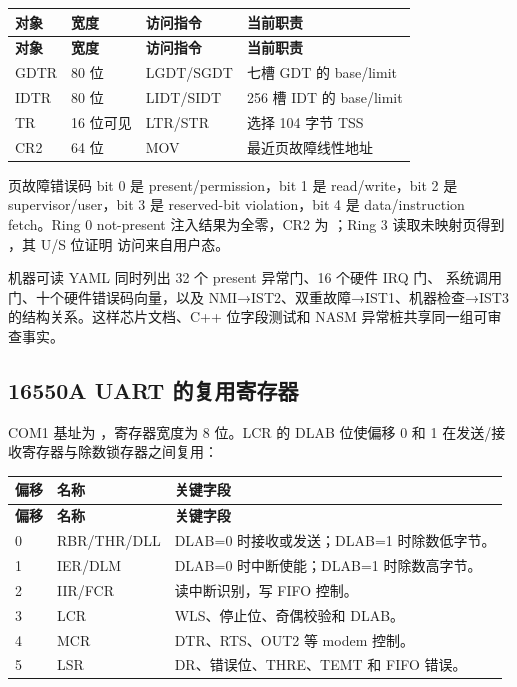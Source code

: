 \begin{longtable}{L{0.10\textwidth}L{0.18\textwidth}L{0.22\textwidth}L{0.34\textwidth}}
\toprule
\textbf{对象} & \textbf{宽度} & \textbf{访问指令} & \textbf{当前职责}\\
\midrule
\endfirsthead
\toprule
\textbf{对象} & \textbf{宽度} & \textbf{访问指令} & \textbf{当前职责}\\
\midrule
\endhead
GDTR & 80 位 & LGDT/SGDT & 七槽 GDT 的 base/limit\\
IDTR & 80 位 & LIDT/SIDT & 256 槽 IDT 的 base/limit\\
TR & 16 位可见 & LTR/STR & 选择 104 字节 TSS\\
CR2 & 64 位 & MOV & 最近页故障线性地址\\
\bottomrule
\end{longtable}

页故障错误码 bit 0 是 present/permission，bit 1 是 read/write，bit 2 是
supervisor/user，bit 3 是 reserved-bit violation，bit 4 是
data/instruction fetch。Ring 0 not-present 注入结果为全零，CR2 为
；Ring 3 读取未映射页得到 ，其 U/S 位证明
访问来自用户态。

机器可读 YAML 同时列出 32 个 present 异常门、16 个硬件 IRQ 门、
 系统调用门、十个硬件错误码向量，以及
NMI→IST2、双重故障→IST1、机器检查→IST3 的结构关系。这样芯片文档、C++
位字段测试和 NASM 异常桩共享同一组可审查事实。

\subsection{16550A UART 的复用寄存器}

COM1 基址为 ，寄存器宽度为 8 位。LCR 的 DLAB 位使偏移 0 和 1
在发送/接收寄存器与除数锁存器之间复用：

\begin{longtable}{L{0.12\textwidth}L{0.30\textwidth}L{0.38\textwidth}}
\toprule
\textbf{偏移} & \textbf{名称} & \textbf{关键字段}\\
\midrule
\endfirsthead
\toprule
\textbf{偏移} & \textbf{名称} & \textbf{关键字段}\\
\midrule
{} & RBR/THR/DLL & DLAB=0 时接收或发送；DLAB=1 时除数低字节。\\
1 & IER/DLM & DLAB=0 时中断使能；DLAB=1 时除数高字节。\\
2 & IIR/FCR & 读中断识别，写 FIFO 控制。\\
3 & LCR & WLS、停止位、奇偶校验和 DLAB。\\
4 & MCR & DTR、RTS、OUT2 等 modem 控制。\\
5 & LSR & DR、错误位、THRE、TEMT 和 FIFO 错误。\\
\bottomrule
\end{longtable}

